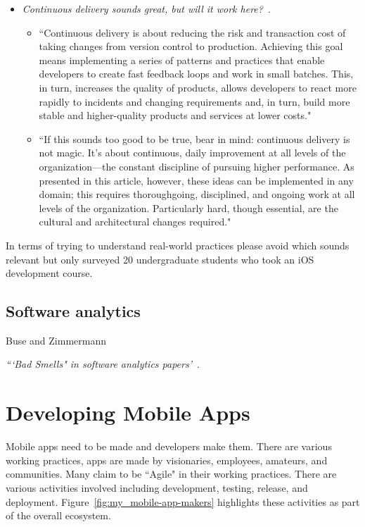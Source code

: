 \begin{itemize}
    \item \emph{Continuous delivery sounds great, but will it work here?}~\citep{humble2018_continuous_delivery_sounds_great}. 
    \begin{itemize}
        \item ``Continuous delivery is about reducing the risk and transaction cost of taking changes from version control to production. Achieving this goal means implementing a series of patterns and practices that enable developers to create fast feedback loops and work in small batches. This, in turn, increases the quality of products, allows developers to react more rapidly to incidents and changing requirements and, in turn, build more stable and higher-quality products and services at lower costs."
        \item ``If this sounds too good to be true, bear in mind: continuous delivery is not magic. It's about continuous, daily improvement at all levels of the organization—the constant discipline of pursuing higher performance. As presented in this article, however, these ideas can be implemented in any domain; this requires thoroughgoing, disciplined, and ongoing work at all levels of the organization. Particularly hard, though essential, are the cultural and architectural changes required."
    \end{itemize}
    
\end{itemize}

In terms of trying to understand real-world practices please avoid \citet{santos2016_investigating_the_adoption_of_agile_practices_by_20_undergrad_students_in_mobile_app_devt} which sounds relevant but only surveyed 20 undergraduate students who took an iOS development course. 

\subsection{Software analytics}
Buse and Zimmermann

\emph{```Bad Smells" in software analytics papers'}~\citep{menzies2019_badsmells_in_software_analytics}.


\section{Developing Mobile Apps}
Mobile apps need to be made and developers make them. There are various working practices, apps are made by visionaries, employees, amateurs, and communities. Many claim to be ``Agile" in their working practices. There are various activities involved including development, testing, release, and deployment. Figure~\ref{fig:my_mobile-app-makers} highlights these activities as part of the overall ecosystem.


